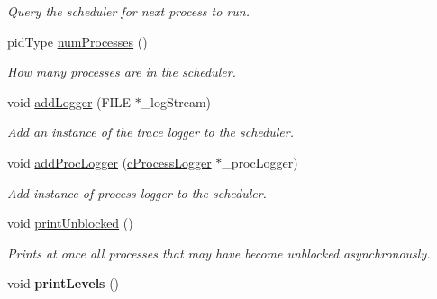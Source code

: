 \begin{DoxyCompactItemize}
\begin{DoxyCompactList}\small\item\em \-Query the scheduler for next process to run. \end{DoxyCompactList}\item 
pid\-Type \hyperlink{classcMultiLevel_ab36db79f48f6dd388eb8504af261d3e4}{num\-Processes} ()
\begin{DoxyCompactList}\small\item\em \-How many processes are in the scheduler. \end{DoxyCompactList}\item 
void \hyperlink{classcMultiLevel_aa26aafd1e6a4582d16b47df72ca68601}{add\-Logger} (\-F\-I\-L\-E $\ast$\-\_\-log\-Stream)
\begin{DoxyCompactList}\small\item\em \-Add an instance of the trace logger to the scheduler. \end{DoxyCompactList}\item 
void \hyperlink{classcMultiLevel_ad87a35e7828a916b4542c0fdd6301323}{add\-Proc\-Logger} (\hyperlink{classcProcessLogger}{c\-Process\-Logger} $\ast$\-\_\-proc\-Logger)
\begin{DoxyCompactList}\small\item\em \-Add instance of process logger to the scheduler. \end{DoxyCompactList}\item 
void \hyperlink{classcMultiLevel_a3e20033afe7915530ad5fc4c9baf0a70}{print\-Unblocked} ()
\begin{DoxyCompactList}\small\item\em \-Prints at once all processes that may have become unblocked asynchronously. \end{DoxyCompactList}\item 
\hypertarget{classcMultiLevel_a993eefedc918f1b03656a2e35df1e2e4}{void {\bfseries print\-Levels} ()}\label{de/d3b/classcMultiLevel_a993eefedc918f1b03656a2e35df1e2e4}

\end{DoxyCompactItemize}
